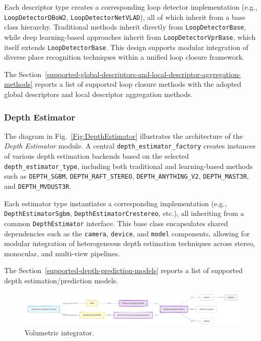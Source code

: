 \documentclass{article}
\begin{document}
Each descriptor type creates a corresponding loop detector implementation (e.g., \texttt{LoopDetectorDBoW2}, \texttt{LoopDetectorNetVLAD}), all of which inherit from a base class hierarchy. Traditional methods inherit directly from \texttt{LoopDetectorBase}, while deep learning-based approaches inherit from \texttt{LoopDetectorVprBase}, which itself extends \texttt{LoopDetectorBase}. This design supports modular integration of diverse place recognition techniques within a unified loop closure framework.

The Section~\ref{supported-global-descriptors-and-local-descriptor-aggregation-methods} reports a list of supported loop closure methods with the adopted global descriptors and local descriptor aggregation methods.


\subsubsection{Depth Estimator}

The diagram in Fig.~\ref{Fig:DepthEstimator} illustrates the architecture of the \textit{Depth Estimator} module. A central \texttt{depth\_estimator\_factory} creates instances of various depth estimation backends based on the selected \texttt{depth\_estimator\_type}, including both traditional and learning-based methods such as \texttt{DEPTH\_SGBM}, \texttt{DEPTH\_RAFT\_STEREO}, \texttt{DEPTH\_ANYTHING\_V2}, \texttt{DEPTH\_MAST3R}, and \texttt{DEPTH\_MVDUST3R}.

Each estimator type instantiates a corresponding implementation (e.g., \texttt{DepthEstimatorSgbm}, \texttt{DepthEstimatorCrestereo}, etc.), all inheriting from a common \texttt{DepthEstimator} interface. This base class encapsulates shared dependencies such as the \texttt{camera}, \texttt{device}, and \texttt{model} components, allowing for modular integration of heterogeneous depth estimation techniques across stereo, monocular, and multi-view pipelines.

The Section~\ref{supported-depth-prediction-models} reports a list of supported depth estimation/prediction models.

\begin{figure}[!t]
\begin{center}
    \includegraphics[width=\textwidth]{./images/volumetric_integrator.png}
\end{center}
\caption{Volumetric integrator.}
\label{Fig:VolumetricIntegrator}
\end{figure}
\end{document}
